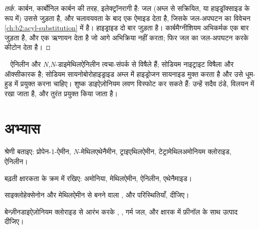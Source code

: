 \begin{proof}[तर्क]
 कार्बन, कार्बोनिल कार्बन की तरह, इलेक्ट्रॉनरागी है: जल (अम्ल से सक्रियित, या
हाइड्रॉक्साइड के रूप में) उससे जुड़ता है, और चलावयवता के बाद एक ऐमाइड देता है, जिसके जल-अपघटन का विवेचन
\cref{ch:b2:acyl-substitution} में है। हाइड्राइड दो बार जुड़ता है। कार्बमैग्नीशियम अभिकर्मक एक बार जुड़ता है,
और एक  ऋणायन देता है जो आगे अभिक्रिया नहीं करता; फिर जल  का जल-अपघटन करके कीटोन देता है।
\end{proof}

\begin{safety}{\,\,\,}
ऐनिलीन और \textit{N},\textit{N}-डाइमेथिलऐनिलीन त्वचा-संपर्क से विषैले हैं; सोडियम नाइट्राइट
विषैला और ऑक्सीकारक है; सोडियम सायनोबोरोहाइड्राइड अम्ल में हाइड्रोजन सायनाइड मुक्त करता है और उसे
धूम-हुड में प्रयुक्त करना चाहिए। शुष्क डाइऐज़ोनियम लवण विस्फोट कर सकते हैं: उन्हें सदैव ठंडे, विलयन में रखा जाता है, और
तुरंत प्रयुक्त किया जाता है।
\end{safety}

\section{अभ्यास}

\begin{exercise}[$\star$]\label{exo:b2:amines:1}
श्रेणी बताइए: प्रोपेन-1-ऐमीन, \textit{N}-मेथिलएथेनैमीन, ट्राइएथिलऐमीन,
टेट्रामेथिलअमोनियम क्लोराइड, ऐनिलीन।
\end{exercise}

\begin{exercise}[$\star$]\label{exo:b2:amines:2}
बढ़ती क्षारकता के क्रम में रखिए: अमोनिया, मेथिलऐमीन, ऐनिलीन, एथेनैमाइड।
\end{exercise}

\begin{exercise}[$\star$]\label{exo:b2:amines:3}
साइक्लोहेक्सेनोन और मेथिलऐमीन से बनने वाला , और परिस्थितियाँ, दीजिए।
\end{exercise}

\begin{exercise}[$\star$]\label{exo:b2:amines:4}
बेन्ज़ीनडाइऐज़ोनियम क्लोराइड से आरंभ करके , , गर्म जल,
और क्षारक में फ़ीनॉल के साथ उत्पाद दीजिए।
\end{exercise}

